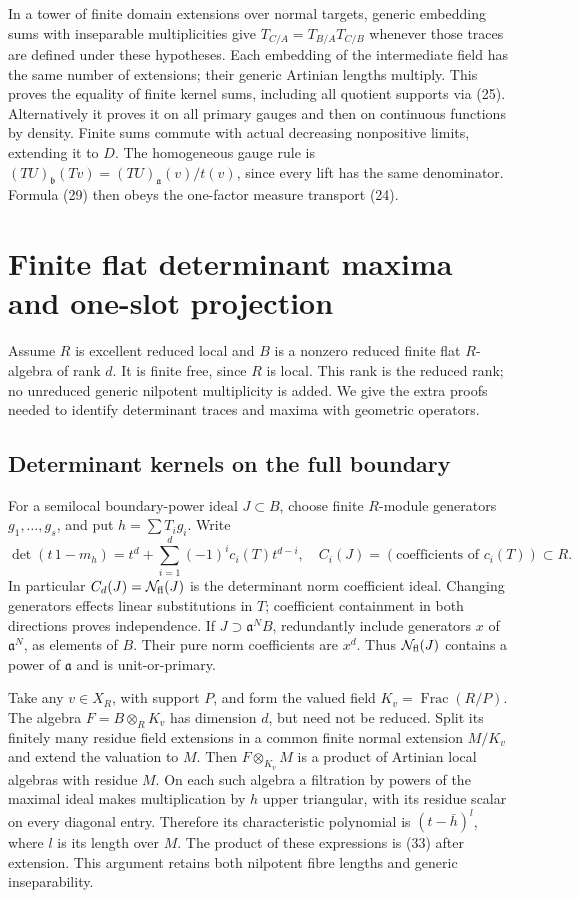\documentclass[11pt]{article}
\begin{document}
In a tower of finite domain extensions over normal targets,
generic embedding sums with inseparable multiplicities give
\(T_{C/A}=T_{B/A}T_{C/B}\) whenever those traces are defined
under these hypotheses. Each embedding of the intermediate
field has the same number of extensions; their generic
Artinian lengths multiply. This proves the equality of
finite kernel sums, including all quotient supports via
(25). Alternatively it proves it on all primary gauges
and then on continuous functions by density. Finite sums
commute with actual decreasing nonpositive limits, extending
it to \(D\). The homogeneous gauge rule is
\((TU)_{\mathfrak b}(Tv)=(TU)_{\mathfrak a}(v)/t(v)\), since
every lift has the same denominator. Formula (29) then
obeys the one-factor measure transport (24).

\section{Finite flat determinant maxima and one-slot projection}
\label{sec:flat}
Assume \(R\) is excellent reduced local and \(B\) is a nonzero
reduced finite flat \(R\)-algebra of rank \(d\). It is finite free,
since \(R\) is local. This rank is the reduced rank; no
unreduced generic nilpotent multiplicity is added.
We give the extra proofs needed to identify determinant traces
and maxima with geometric operators.

\subsection*{Determinant kernels on the full boundary}
For a semilocal boundary-power ideal \(J\subset B\), choose finite
\(R\)-module generators \(g_1,\ldots,g_s\), and put
\(h=\sum T_i g_i\). Write
\[
 \det(t\,1-m_h)=t^d+\sum_{i=1}^d(-1)^i c_i(T)t^{d-i},\quad
 C_i(J)=(\text{coefficients of }c_i(T))\subset R.
                                                               \tag{33}
\]
In particular \(C_d(J)=\mathcal N_{\rm fl}(J)\) is the
determinant norm coefficient ideal.
Changing generators effects linear substitutions in \(T\);
coefficient containment in both directions proves independence.
If \(J\supset\mathfrak a^N B\), redundantly include generators
\(x\) of \(\mathfrak a^N\), as elements of \(B\).
Their pure norm coefficients are \(x^d\). Thus
\(\mathcal N_{\rm fl}(J)\) contains a power of \(\mathfrak a\)
and is unit-or-primary.

Take any \(v\in X_R\), with support \(P\), and form the valued
field \(K_v=\operatorname{Frac}(R/P)\).
The algebra \(F=B\otimes_R K_v\) has dimension \(d\), but need
not be reduced. Split its finitely many residue field
extensions in a common finite normal extension \(M/K_v\)
and extend the valuation to \(M\).
Then \(F\otimes_{K_v}M\) is a product of Artinian local
algebras with residue \(M\). On each such algebra a filtration
by powers of the maximal ideal makes multiplication by \(h\)
upper triangular, with its residue scalar on every diagonal
entry. Therefore its characteristic polynomial is
\((t-\bar h)^{l}\), where \(l\) is its length over \(M\).
The product of these expressions is (33) after extension.
This argument retains both nilpotent fibre lengths and
generic inseparability.
\end{document}
